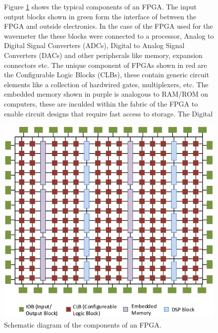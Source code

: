 \documentclass[12pt, twoside]{report}
\begin{document}
\vspace{1em}
\begin{figure}[H]
    \begin{minipage}{0.45\textwidth}
    Figure \ref{fpga-schematic} shows the typical components of an FPGA. The input output blocks shown in green form the interface of between the FPGA and outside electronics. In the case of the FPGA used for the wavemeter the these blocks were connected to a processor, Analog to Digital Signal Converters (ADCs), Digital to Analog Signal Converters (DACs) and other peripherals like memory, expansion connectors etc. The unique component of FPGAs shown in red are the Configurable Logic Blocks (CLBs), these contain generic circuit elements like a collection of hardwired gates, multiplexers, etc. The embedded memory shown in purple is analogous to RAM/ROM on computers, these are inculded within the fabric of the FPGA to enable circuit designs that require fast access to storage. The Digital 
    \end{minipage}%
    \hfill
    \begin{minipage}{0.5\textwidth}
    \centering
    \includegraphics[width=\textwidth]{figs/fpga-schematic.png}
    \caption{Schematic diagram of the components of an FPGA.\cite{fpga-schematic-diag}}
    \label{fpga-schematic}
  \end{minipage}    
\end{figure}
\end{document}
